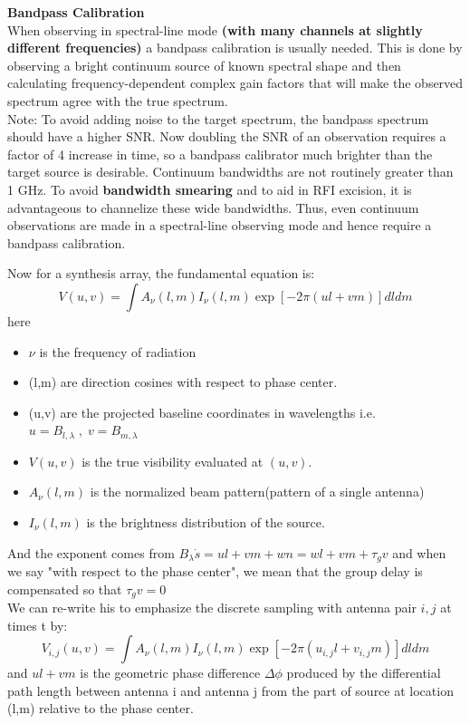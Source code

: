 \documentclass[10pt]{report}
\newcommand{\tbf}[1]{\textbf{#1}}
\begin{document}
\tbf{Bandpass Calibration}\\

When observing in spectral-line mode \tbf{(with many channels at slightly different frequencies)} a bandpass calibration is usually needed.  This is done by observing a bright continuum source of known spectral shape and then calculating frequency-dependent complex gain factors that will make the observed spectrum agree with the true spectrum.\\

Note:  To avoid adding noise to the target spectrum, the bandpass spectrum should have a higher SNR. Now doubling the SNR of an observation requires a factor of 4 increase in time, so a bandpass calibrator much brighter than the target source is desirable.   Continuum bandwidths are not routinely greater than 1 GHz.  To avoid \tbf{bandwidth smearing} and to aid in RFI excision, it is advantageous to channelize these wide bandwidths.  Thus, even continuum observations are made in a spectral-line observing mode and hence require a bandpass calibration. 



Now for a synthesis array, the fundamental equation is:
\begin{equation}\label{eq:compvis}
V(u,v)=\int A_\nu(l,m)I_\nu(l,m)\exp[-2 \pi (u l+vm)]dl dm 
\end{equation}
here
\begin{itemize}
\item $\nu$ is the frequency of radiation
\item (l,m) are direction cosines with respect to phase center.
\item (u,v) are the projected baseline coordinates in wavelengths i.e. $u=B_{l,\lambda}\;,\;v=B_{m,\lambda}$
\item $V(u,v)$ is the true visibility evaluated at $(u,v)$.
\item $A_\nu(l,m)$ is the normalized beam pattern(pattern of a single antenna)
\item $I_\nu(l,m)$ is the brightness distribution of the source.
\end{itemize}

And the exponent comes from $B_\lambda \dot s = ul+vm+wn=wl+vm+\tau_g v$ and when we say "with respect to the phase center", we mean that the group delay is compensated so that $\tau_g v=0$\\

We can re-write his to emphasize the discrete sampling with antenna pair $i,j$ at times t by:
\begin{equation}
V_{i,j}(u,v)=\int A_\nu(l,m)I_\nu(l,m)\exp[-2 \pi (u_{i,j} l+v_{i,j} m)]dl dm 
\end{equation}
and $ul+vm$ is the geometric phase difference $\Delta \phi$ produced by the differential path length  between antenna i and antenna j  from the part of source at location (l,m) relative to the phase center.\\
\end{document}
